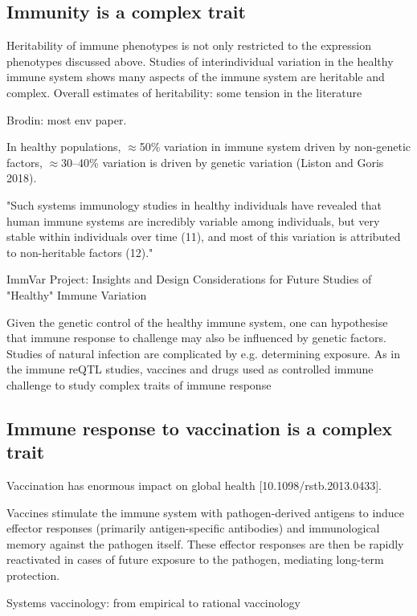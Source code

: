 \begin{outline}
\section{Immunity is a complex trait}

\1 Heritability of immune phenotypes is not only restricted to the expression phenotypes discussed above.
    \2 Studies of interindividual variation in the healthy immune system shows many aspects of the immune system are heritable and complex.
    \2 Overall estimates of heritability: some tension in the literature

    Brodin: most env paper.

    In healthy populations, $\approx$50\% variation in immune system driven by non-genetic factors, $\approx$30–40\% variation is driven by genetic variation (Liston and Goris 2018).

    "Such systems  immunology studies in  healthy individuals have  revealed that human immune  systems are incredibly  variable among individuals,  but very stable within  individuals over time (11),  and most of this variation is  attributed to non-heritable  factors (12)."

     ImmVar Project: Insights and Design Considerations for Future Studies of "Healthy" Immune Variation 

\1 Given the genetic control of the healthy immune system, one can hypothesise that immune response to challenge may also be influenced by genetic factors.
    \2 Studies of natural infection are complicated by e.g. determining exposure.
    As in the immune reQTL studies, vaccines and drugs used as controlled immune challenge to study complex traits of immune response

\subsection{Immune response to vaccination is a complex trait}

Vaccination has enormous impact on global health [10.1098/rstb.2013.0433].

Vaccines stimulate the immune system with pathogen-derived antigens to induce effector responses (primarily antigen-specific antibodies) and immunological memory against the pathogen itself.
These effector responses are then be rapidly reactivated in cases of future exposure to the pathogen, mediating long-term protection.

Systems vaccinology: from empirical to rational vaccinology


\end{outline}
